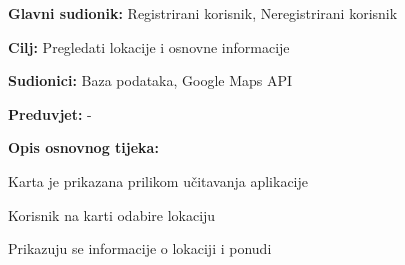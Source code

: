 				
					

					\noindent {}
					\begin{packed_item}
	
						\item \textbf{Glavni sudionik: }Registrirani korisnik, Neregistrirani korisnik
						\item  \textbf{Cilj:} Pregledati lokacije i osnovne informacije
						\item  \textbf{Sudionici:} Baza podataka, Google Maps API
						\item  \textbf{Preduvjet:} -
						\item  \textbf{Opis osnovnog tijeka:}
						
						\item[] \begin{packed_enum}
	
							\item Karta je prikazana prilikom učitavanja aplikacije
							\item Korisnik na karti odabire lokaciju
							\item Prikazuju se informacije o lokaciji i ponudi

						\end{packed_enum}
						
					\end{packed_item}
					

